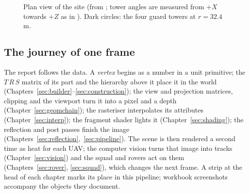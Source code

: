 \begin{figure}[h]
\centering
{}
\caption{Plan view of the site (from ; tower angles are measured from $+X$ towards $+Z$ as in
). Dark circles: the four guard towers at $r=32.4$\,m.}
\label{fig:plan}
\end{figure}

\subsection{The journey of one frame}
The report follows the data. A \emph{vertex} begins as a number in a unit primitive; the $T\,R\,S$ matrix of its part and the hierarchy above it place it in the world (Chapters~\ref{sec:builder}--\ref{sec:construction}); the view and projection matrices, clipping and the viewport turn
it into a pixel and a depth (Chapter~\ref{sec:geomchain}); the rasteriser interpolates its attributes (Chapter~\ref{sec:interp}); the fragment shader lights it (Chapter~\ref{sec:shading}); the reflection and post passes finish the image (Chapters~\ref{sec:reflection},~\ref{sec:pipeline}).
The scene is then rendered a second time as heat for each UAV; the computer vision turns that image into tracks (Chapter~\ref{sec:vision}) and the squad and rovers act on them (Chapters~\ref{sec:rover}, \ref{sec:squad}), which changes the next frame. A strip at the head of each
chapter marks its place in this pipeline; workbook screenshots accompany the objects they document.

